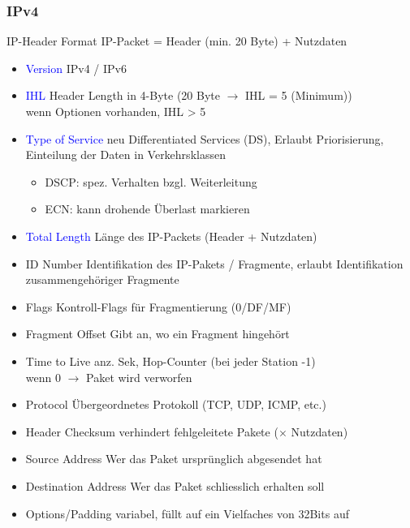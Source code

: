\subsubsection{IPv4}

\begin{KR}{IP-Header Format}
    {\small IP-Packet = Header (min. 20 Byte) + Nutzdaten}
    \begin{itemize}
        \item \textcolor{blue}{Version} IPv4 / IPv6
        \item \textcolor{blue}{IHL} Header Length in 4-Byte (20 Byte $\rightarrow$ IHL = 5 (Minimum))
            \\ wenn Optionen vorhanden, IHL > 5
        \item \textcolor{blue}{Type of Service} neu Differentiated Services (DS), Erlaubt Priorisierung, Einteilung der Daten in Verkehrsklassen
        \begin{itemize}
            \item DSCP: spez. Verhalten bzgl. Weiterleitung
            \item ECN: kann drohende Überlast markieren
        \end{itemize}
        \item \textcolor{blue}{Total Length} Länge des IP-Packets (Header + Nutzdaten)
        \item \textcolor{darkcorn}{ID Number} Identifikation des IP-Pakets / Fragmente, erlaubt Identifikation zusammengehöriger Fragmente
        \item \textcolor{darkcorn}{Flags} Kontroll-Flags für Fragmentierung (0/DF/MF)
        \item \textcolor{darkcorn}{Fragment Offset} Gibt an, wo ein Fragment hingehört
        \item \textcolor{darkfrog}{Time to Live} anz. Sek, Hop-Counter (bei jeder Station -1) \\wenn 0 $\rightarrow$ Paket wird verworfen
        \item \textcolor{darkfrog}{Protocol} Übergeordnetes Protokoll (TCP, UDP, ICMP, etc.)
        \item \textcolor{darkpurple}{Header Checksum} verhindert fehlgeleitete Pakete ($\times $ Nutzdaten)
        \item \textcolor{darkpurple}{Source Address} Wer das Paket ursprünglich abgesendet hat
        \item \textcolor{darkpurple}{Destination Address} Wer das Paket schliesslich erhalten soll
        \item \textcolor{darkpurple}{Options/Padding} variabel, füllt auf ein Vielfaches von 32Bits auf

\end{itemize}
\end{KR}
